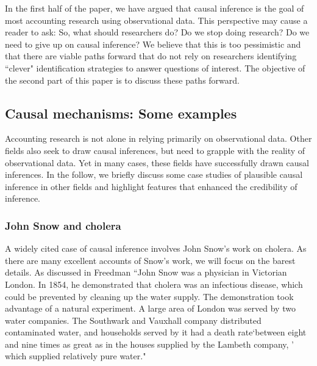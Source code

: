 \documentclass[11pt]{amsart}
\begin{document}
In the first half of the paper, we have argued that causal inference is the goal of most accounting research using observational data.
This perspective may cause a reader to ask: So, what should researchers do? Do we stop doing research? Do we need to give up on causal inference? 
We believe that this is too pessimistic and that there are viable paths forward that do not rely on researchers identifying ``clever" identification strategies to answer questions of interest.
The objective of the second part of this paper is to discuss these paths forward.

\subsection{Causal mechanisms: Some examples}

Accounting research is not alone in relying primarily on observational data.
Other fields also seek to draw causal inferences, but need to grapple with the reality of observational data. 
Yet in many cases, these fields have successfully drawn causal inferences.
In the follow, we briefly discuss some case studies of plausible causal inference in other fields and highlight features that enhanced the credibility of inference.

\subsubsection{John Snow and cholera}
A widely cited case of causal inference involves John Snow's work on cholera.
As there are many excellent accounts of Snow's work, we will focus on the barest details.
As discussed in Freedman %
``John Snow was a physician in Victorian London.
 In 1854, he demonstrated that cholera was an infectious disease, which could be prevented by cleaning up the water supply. 
The demonstration took advantage of a natural experiment.
 A large area of London was served by two water companies. 
 The Southwark and Vauxhall company distributed contaminated water, and households served by it had a death rate`between eight and nine times as great as in the houses supplied by the Lambeth company, ' which supplied relatively pure water."
\end{document}

